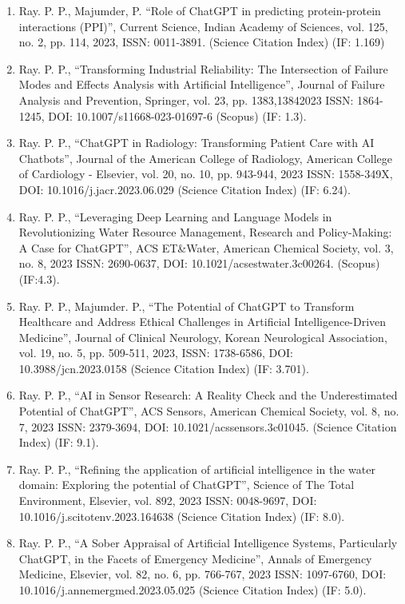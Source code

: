 \documentclass[11pt,a4paper]{moderncv}
\begin{document}
\begin{adjustwidth}{6em}{0pt}
\begin{enumerate}
		\item Ray. P. P., Majumder, P. “Role of ChatGPT in predicting protein-protein interactions (PPI)”, Current Science, Indian Academy of Sciences, vol. 125, no. 2, pp. 114, 2023, ISSN: 0011-3891. (Science Citation Index) (IF: 1.169)
				
		\item Ray. P. P., “Transforming Industrial Reliability: The Intersection of Failure Modes and Effects Analysis with Artificial Intelligence”, Journal of Failure Analysis and Prevention, Springer, vol. 23, pp. 1383,13842023 ISSN: 1864-1245, DOI: 10.1007/s11668-023-01697-6 (Scopus) (IF: 1.3). 
		
		\item Ray. P. P., “ChatGPT in Radiology: Transforming Patient Care with AI Chatbots”, Journal of the American College of Radiology, American College of Cardiology - Elsevier, vol. 20, no. 10, pp. 943-944, 2023 ISSN: 1558-349X, DOI: 10.1016/j.jacr.2023.06.029 (Science Citation Index) (IF: 6.24). 
		
		\item Ray. P. P., “Leveraging Deep Learning and Language Models in Revolutionizing Water Resource Management, Research and Policy-Making: A Case for ChatGPT”, ACS ET\&Water, American Chemical Society, vol. 3, no. 8, 2023 ISSN: 2690-0637, DOI: 10.1021/acsestwater.3c00264. (Scopus) (IF:4.3). 
		
		\item Ray. P. P., Majumder. P., “The Potential of ChatGPT to Transform Healthcare and Address Ethical Challenges in Artificial Intelligence-Driven Medicine”, Journal of Clinical Neurology, Korean Neurological Association, vol. 19, no. 5, pp. 509-511, 2023, ISSN: 1738-6586, DOI: 10.3988/jcn.2023.0158 (Science Citation Index) (IF: 3.701). 
		
		\item Ray. P. P., “AI in Sensor Research: A Reality Check and the Underestimated Potential of ChatGPT”, ACS Sensors, American Chemical Society, vol. 8, no. 7, 2023 ISSN: 2379-3694, DOI: 10.1021/acssensors.3c01045. (Science Citation Index) (IF: 9.1). 
		
		\item Ray. P. P., “Refining the application of artificial intelligence in the water domain: Exploring the potential of ChatGPT”, Science of The Total Environment, Elsevier, vol. 892, 2023 ISSN: 0048-9697, DOI: 10.1016/j.scitotenv.2023.164638 (Science Citation Index) (IF: 8.0). 
		
		\item Ray. P. P., “A Sober Appraisal of Artificial Intelligence Systems, Particularly ChatGPT, in the Facets of Emergency Medicine”, Annals of Emergency Medicine, Elsevier, vol. 82, no. 6, pp. 766-767, 2023 ISSN: 1097-6760, DOI: 10.1016/j.annemergmed.2023.05.025 (Science Citation Index) (IF: 5.0). 
		

\end{enumerate}
\end{adjustwidth}
\end{document}
